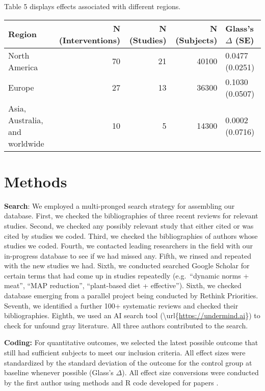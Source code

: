 \documentclass[sn-nature,pdflatex]{sn-jnl}
\begin{document}
Table 5 displays effects associated with different regions.

\begin{table}[!h]
\centering
\begin{tabular}{lrrrl}
\toprule
Region & N (Interventions) & N (Studies) & N (Subjects) & Glass's $\Delta$ (SE)\\
\midrule
North America & 70 & 21 & 40100 & 0.0477 (0.0251)\\
Europe & 27 & 13 & 36300 & 0.1030 (0.0507)\\
Asia, Australia, and worldwide & 10 & 5 & 14300 & 0.0002 (0.0716)\\
\bottomrule
\end{tabular}
\end{table}

\section{Methods}\label{sec3}

\textbf{Search}: We employed a multi-pronged search strategy for
assembling our database. First, we checked the bibliographies of three
recent reviews
\citep{mathur2021meta, bianchi2018conscious, bianchi2018restructuring}
for relevant studies. Second, we checked any possibly relevant study
that either cited or was cited by studies we coded. Third, we checked
the bibliographies of authors whose studies we coded. Fourth, we
contacted leading researchers in the field with our in-progress database
to see if we had missed any. Fifth, we rinsed and repeated with the new
studies we had. Sixth, we conducted searched Google Scholar for certain
terms that had come up in studies repeatedly (e.g.~``dynamic norms +
meat'', ``MAP reduction'', ``plant-based diet + effective''). Sixth, we
checked database emerging from a parallel project being conducted by
Rethink Priorities. Seventh, we identified a further 100+ systematic
reviews and checked their bibliographies. Eighth, we used an AI search
tool (\textbackslash url\{\url{https://undermind.ai}\}) to check for
unfound gray literature. All three authors contributed to the search.

\textbf{Coding:} For quantitative outcomes, we selected the latest
possible outcome that still had sufficient subjects to meet our
inclusion criteria. All effect sizes were standardized by the standard
deviation of the outcome for the control group at baseline whenever
possible (Glass's \(\Delta\)). All effect size conversions were
conducted by the first author using methods and R code developed for
papers \citep{paluck2019, porat2024}.
\end{document}
